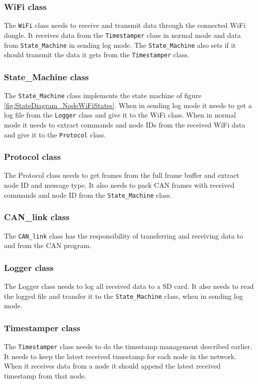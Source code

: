 \subsubsection*{WiFi class}
The \texttt{WiFi} class needs to receive and transmit data through the connected WiFi dongle.
It receives data from the \texttt{Timestamper} class in normal mode and data from \texttt{State\_Machine} in sending log mode.
The \texttt{State\_Machine} also sets if it should transmit the data it gets from the \texttt{Timestamper} class. 

\subsubsection*{State\_Machine class}
The \texttt{State\_Machine} class implements the state machine of figure \ref{fig:StateDiagram_NodeWiFiStates}.
When in sending log mode it needs to get a log file from the \texttt{Logger} class and give it to the WiFi class.
When in normal mode it needs to extract commands and node IDs from the received WiFi data and give it to the \texttt{Protocol} class.

\subsubsection*{Protocol class}
The Protocol class needs to get frames from the full frame buffer and extract node ID and message type. 
It also needs to pack CAN frames with received commands and node ID from the \texttt{State\_Machine} class.

\subsubsection*{CAN\_link class}
The \texttt{CAN\_link} class has the responsibility of transferring and receiving data to
and from the CAN program.

\subsubsection*{Logger class}
The Logger class needs to log all received data to a SD card.
It also needs to read the logged file and transfer it to the \texttt{State\_Machine} class, when in sending log mode.

\subsubsection*{Timestamper class}
The \texttt{Timestamper} class needs to do the timestamp management described earlier.
It needs to keep the latest received timestamp for each node in the network.
When it receives data from a node it should append the latest received timestamp from that node.  


